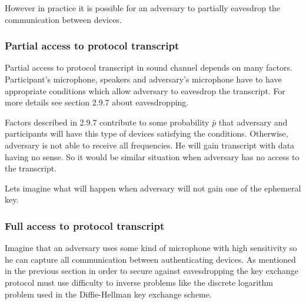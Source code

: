 \documentclass[11pt,titlepage]{article}
\theoremstyle{plain}
\begin{document}
\vspace{5mm}

However in practice it is possible for an adversary to partially eavesdrop the communication between devices.

\subsubsection{Partial access to protocol transcript}

Partial access to protocol transcript in sound channel depends on many factors. Participant's microphone, speakers and adversary's microphone have to have appropriate conditions which allow adversary to eavesdrop the transcript. For more details see section 2.9.7 about eavesdropping.

\vspace{5mm}

Factors described in 2.9.7 contribute to some probability $\bar{p}$ that adversary and participants will have this type of devices satisfying the conditions. Otherwise, adversary is not able to receive all frequencies. He will gain transcript with data having no sense. So it would be similar situation when adversary has no access to the transcript.  

\vspace{5mm}

Lets imagine what will happen when adversary will not gain one of the ephemeral key.
\subsubsection{Full access to protocol transcript}
Imagine that an adversary uses some kind of microphone with high sensitivity so he can capture all communication between authenticating devices. As mentioned in the previous section in order to secure against eavesdropping the key exchange protocol must use difficulty to inverse problems like the discrete logarithm problem used in the Diffie-Hellman key exchange scheme.
\end{document}
